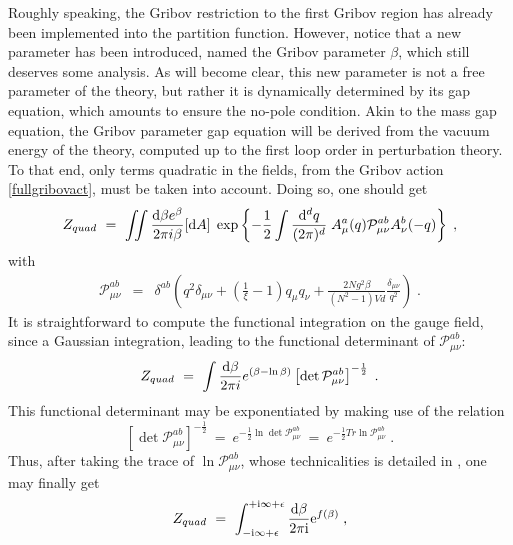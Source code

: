 Roughly speaking, the Gribov restriction to the first Gribov region has already been
implemented into the partition function. However, notice that a new parameter has been
introduced, named the Gribov parameter $\beta$, which still deserves some analysis. As will
become clear, this new parameter is not a free parameter of the theory, but rather it is
dynamically determined by its gap equation, which amounts to ensure the no-pole condition. Akin
to the mass gap equation, the Gribov parameter gap equation will be derived from the vacuum
energy of the theory, computed up to the first loop order in perturbation theory. To that end,
only terms quadratic in the fields, from the Gribov action \eqref{fullgribovact}, must be taken
into account. Doing so, one should get
\begin{equation}
Z_{quad} ~=~ \iint \frac{\mathrm{d}\beta e^{\beta }}{2\pi i\beta } [\mathrm{d} A] \; 
\exp \left\{-\frac{1}{2}  \int \frac{\mathrm{d}^{d}q}{(2\pi )^{d}}  \;  A_{\mu }^{a}(q)\mathcal{P}_{\mu \nu }^{ab }A_{\nu }^{b }(-q)    \right\}  \;,
\label{Zq0}
\end{equation}
with
\begin{eqnarray}
\mathcal{P}_{\mu \nu }^{ab} &=&  \delta^{ab } \left(  q^{2}\delta _{\mu \nu }   +  \left( \frac{1}{\xi } -1 \right) q_{\mu }q_{\nu } +  \frac{2Ng^{2}\beta}{(N^{2}-1)Vd} \frac{\delta _{\mu \nu }}{q^{2}}   \right)   \;.
\label{P0}
\end{eqnarray}
It is straightforward to compute the functional integration on the gauge field, since a
Gaussian integration, leading to the functional determinant of $\mathcal{P}_{\mu \nu }^{ab}$:
\begin{equation}
Z_{quad}  ~=~ \int {\frac{\ensuremath{\mathrm{d}}\beta}{2\pi i} }
e^{({\beta} -\ln\beta)} \left[\det\mathcal{P}^{ab}_{\mu\nu}\right]^{-\frac{1}{2}} \;.
\label{Zq2f00}
\end{equation}
This functional determinant may be exponentiated by making use of the relation
\begin{equation}
\left[ \det \mathcal{P}_{\mu\nu}^{ab} \right]^{-\frac{1}{2}} ~=~ e^{-\frac{1}{2} \ln \det
\mathcal{P}_{\mu\nu}^{ab}} ~=~ e^{-\frac{1}{2}Tr \ln \mathcal{P}_{\mu\nu}^{ab}} \;.
\label{functdeterminant}
\end{equation}
Thus, after taking the trace of $\ln\mathcal{P}_{\mu \nu }^{ab}$, whose technicalities is
detailed in \cite{Vandersickel:2012tz}, one may finally get
\begin{eqnarray}
Z_{quad} ~=~ \int_{- \mathrm{i} \infty + \epsilon}^{+ \mathrm{i} \infty + \epsilon}\frac{\mathrm{d} \beta}{2\pi \mathrm{i}} \mathrm{e}^{f(\beta)} \;,
\label{ven}
\end{eqnarray}
